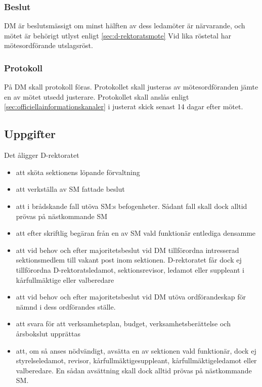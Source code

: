 \documentclass[a4paper,12pt]{article}
\begin{document}
\subsubsection{Beslut}

DM är beslutsmässigt om minst hälften av dess ledamöter är närvarande, och mötet är behörigt utlyst enligt \ref{sec:d-rektoratsmote} Vid lika röstetal har mötesordförande utslagsröst.

\subsubsection{Protokoll}

På DM skall protokoll föras. Protokollet skall justeras av mötesordföranden jämte en av mötet utsedd justerare. Protokollet skall anslås enligt \ref{sec:officiellainformationskanaler} i justerat skick senast 14 dagar efter mötet.

\subsection{Uppgifter}

Det åligger D-rektoratet

\begin{itemize}
  \item att sköta sektionens löpande förvaltning
  \item att verkställa av SM fattade beslut
  \item att i brådskande fall utöva SM:s befogenheter. Sådant fall skall dock alltid prövas på nästkommande SM
  \item att efter skriftlig begäran från en av SM vald funktionär entlediga densamme
  \item att vid behov och efter majoritetsbeslut vid DM tillförordna intresserad sektionsmedlem till vakant post inom sektionen. D-rektoratet får dock ej tillförordna D-rektoratsledamot, sektionsrevisor, ledamot eller suppleant i kårfullmäktige eller valberedare
  \item att vid behov och efter majoritetsbeslut vid DM utöva ordförandeskap för nämnd i dess ordförandes ställe.
  \item att svara för att verksamhetsplan, budget, verksamhetsberättelse och årsbokslut upprättas
  \item att, om så anses nödvändigt, avsätta en av sektionen vald funktionär, dock ej styrelseledamot, revisor, kårfullmäktigesuppleant, kårfullmäktigeledamot eller valberedare. En sådan avsättning skall dock alltid prövas på nästkommande SM.
\end{itemize}
\end{document}
